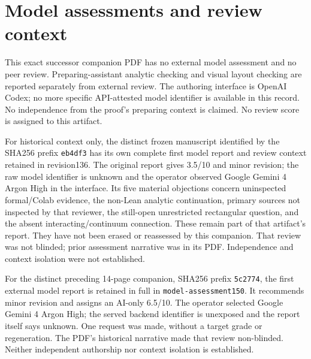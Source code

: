 \documentclass[11pt,a4paper]{article}
\begin{document}
\clearpage
\section{Model assessments and review context}
\label{sec:companion-review-context}
This exact successor companion PDF has no external model assessment and no peer
review. Preparing-assistant analytic checking and visual layout checking
are reported separately from external review. The authoring interface is
OpenAI Codex; no more specific API-attested model identifier is available
in this record. No independence from the proof's preparing context is
claimed. No review score is assigned to this artifact.

For historical context only, the distinct frozen manuscript identified by
the SHA256 prefix \texttt{eb4df3} has its own complete first model report and
review context retained in revision136. The original report gives
3.5/10 and minor revision; the raw model identifier is unknown and the
operator observed Google Gemini 4 Argon High in the interface. Its five
material objections concern uninspected formal/Colab evidence, the
non-Lean analytic continuation, primary sources not inspected by that
reviewer, the still-open unrestricted rectangular question, and the
absent interacting/continuum connection. These remain part of that
artifact's report. They have not been erased or reassessed by this
companion. That review was not blinded; prior assessment narrative was
in its PDF. Independence and context isolation were not established.

For the distinct preceding 14-page companion, SHA256 prefix
\texttt{5c2774}, the first external model report is retained in full in
\texttt{model-assessment150}. It recommends minor revision and assigns
an AI-only 6.5/10. The operator selected Google Gemini 4 Argon High;
the served backend identifier is unexposed and the report itself says
unknown. One request was made, without a target grade or regeneration.
The PDF's historical narrative made that review non-blinded. Neither
independent authorship nor context isolation is established.
\end{document}
